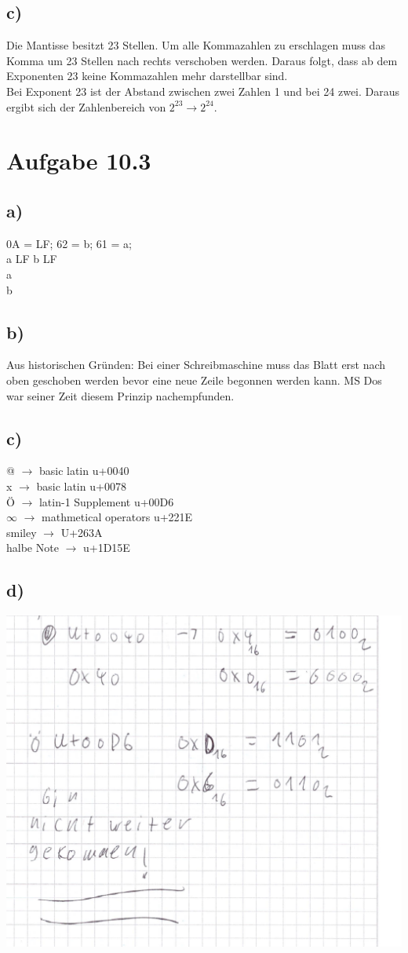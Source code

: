 \documentclass{article}
\begin{document}
	\subsection*{c)}
	Die Mantisse besitzt 23 Stellen. Um alle Kommazahlen zu erschlagen muss das Komma um 23 Stellen nach rechts verschoben werden. Daraus folgt, dass ab dem Exponenten 23 keine Kommazahlen mehr darstellbar sind. \\
	Bei Exponent 23 ist der Abstand zwischen zwei Zahlen 1 und bei 24 zwei. Daraus ergibt sich der Zahlenbereich von $2^{23} \to 2^{24}$.
	\section*{Aufgabe 10.3}
	\subsection*{a)}
	0A = LF; 62 = b; 61 = a;  \\
	a LF b LF \\
	a \\
	b \\
	\subsection*{b)}
	Aus historischen Gründen: Bei einer Schreibmaschine muss das Blatt erst nach oben geschoben werden bevor eine neue Zeile begonnen werden kann. MS Dos war seiner Zeit diesem Prinzip nachempfunden.
	\subsection*{c)}
	@ $\to$ basic latin u+0040 \\
	x $\to$ basic latin u+0078 \\
	Ö $\to$ latin-1 Supplement u+00D6 \\
	$\infty$ $\to$ mathmetical operators u+221E \\
	smiley $\to$ U+263A \\
	halbe Note $\to$ u+1D15E
	\subsection*{d)}
	\includegraphics[width=\linewidth]{103d}
\end{document}
